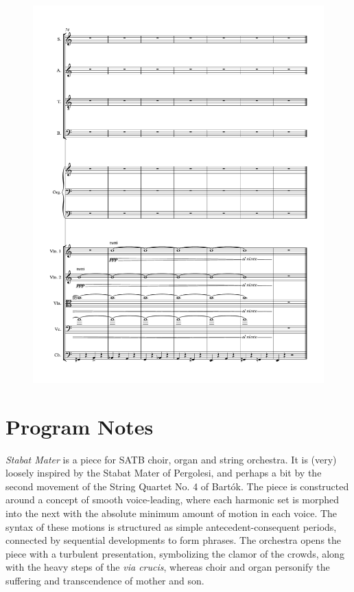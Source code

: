 \begin{figure}[htbp]
    \centering
	\includegraphics[width=6.5in]{figures/Stabat_Mater_14.pdf}
\end{figure}

\section*{Program Notes}

\emph{Stabat Mater} is a piece for SATB choir, organ and string orchestra. It is (very) loosely inspired by the Stabat Mater of Pergolesi, and perhaps a bit by the second movement of the String Quartet No. 4 of Bart\'{o}k. The piece is constructed around a concept of smooth voice-leading, where each harmonic set is morphed into the next with the absolute minimum amount of motion in each voice. The syntax of these motions is structured as simple antecedent-consequent periods, connected by sequential developments to form phrases. The orchestra opens the piece with a turbulent presentation, symbolizing the clamor of the crowds, along with the heavy steps of the \emph{via crucis}, whereas choir and organ personify the suffering and transcendence of mother and son.

